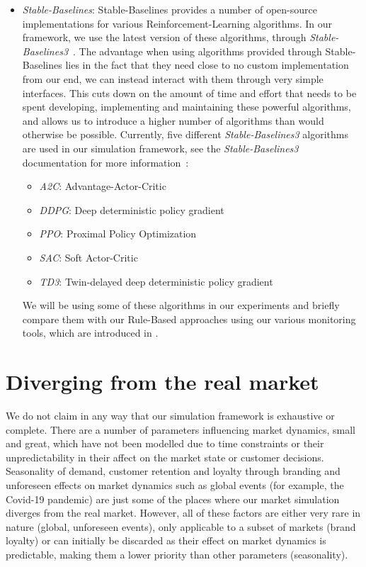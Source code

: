 \begin{enumerate}
\begin{itemize}
		      \item \emph{Stable-Baselines}: Stable-Baselines provides a number of open-source implementations for various Reinforcement-Learning algorithms. In our framework, we use the latest version of these algorithms, through \emph{Stable-Baselines3}~\cite{StableBaselines3}. The advantage when using algorithms provided through Stable-Baselines lies in the fact that they need close to no custom implementation from our end, we can instead interact with them through very simple interfaces. This cuts down on the amount of time and effort that needs to be spent developing, implementing and maintaining these powerful algorithms, and allows us to introduce a higher number of algorithms than would otherwise be possible. Currently, five different \emph{Stable-Baselines3} algorithms are used in our simulation framework, see the \emph{Stable-Baselines3} documentation for more information~\cite{StableBaselines3Algorithms}:
		            \begin{itemize}
			            \item \emph{A2C}: Advantage-Actor-Critic
			            \item \emph{DDPG}: Deep deterministic policy gradient
			            \item \emph{PPO}: Proximal Policy Optimization
			            \item \emph{SAC}: Soft Actor-Critic
			            \item \emph{TD3}: Twin-delayed deep deterministic policy gradient
		            \end{itemize}
		            We will be using some of these algorithms in our experiments and briefly compare them with our Rule-Based approaches using our various monitoring tools, which are introduced in .
	      \end{itemize}
\end{enumerate}


\section{Diverging from the real market}

We do not claim in any way that our simulation framework is exhaustive or complete. There are a number of parameters influencing market dynamics, small and great, which have not been modelled due to time constraints or their unpredictability in their affect on the market state or customer decisions. Seasonality of demand, customer retention and loyalty through branding and unforeseen effects on market dynamics such as global events (for example, the Covid-19 pandemic) are just some of the places where our market simulation diverges from the real market. However, all of these factors are either very rare in nature (global, unforeseen events), only applicable to a subset of markets (brand loyalty) or can initially be discarded as their effect on market dynamics is predictable, making them a lower priority than other parameters (seasonality).

